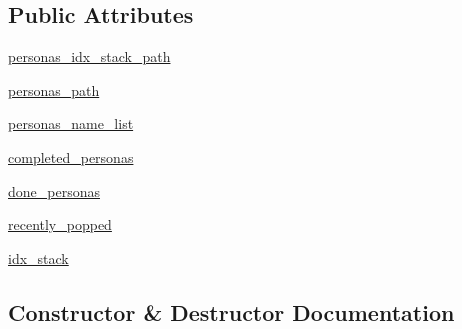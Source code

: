 \subsection*{Public Attributes}
\begin{DoxyCompactItemize}
\item 
\hyperlink{classparlai_1_1mturk_1_1tasks_1_1personachat_1_1personachat__rephrase_1_1worlds_1_1PersonasGenerator_a47aadd2ff6148aa086887f039f046224}{personas\+\_\+idx\+\_\+stack\+\_\+path}
\item 
\hyperlink{classparlai_1_1mturk_1_1tasks_1_1personachat_1_1personachat__rephrase_1_1worlds_1_1PersonasGenerator_a1881802d9147808660941e18155f4f4a}{personas\+\_\+path}
\item 
\hyperlink{classparlai_1_1mturk_1_1tasks_1_1personachat_1_1personachat__rephrase_1_1worlds_1_1PersonasGenerator_ab4a565162feafbcbc20f9f6029c41f34}{personas\+\_\+name\+\_\+list}
\item 
\hyperlink{classparlai_1_1mturk_1_1tasks_1_1personachat_1_1personachat__rephrase_1_1worlds_1_1PersonasGenerator_a7ed591a1f642f4f9113a90cf68fb11d4}{completed\+\_\+personas}
\item 
\hyperlink{classparlai_1_1mturk_1_1tasks_1_1personachat_1_1personachat__rephrase_1_1worlds_1_1PersonasGenerator_a64b6d5528c2c230c4736f68c59311fa2}{done\+\_\+personas}
\item 
\hyperlink{classparlai_1_1mturk_1_1tasks_1_1personachat_1_1personachat__rephrase_1_1worlds_1_1PersonasGenerator_af672da71808e22edc2bbb5ba41c1af13}{recently\+\_\+popped}
\item 
\hyperlink{classparlai_1_1mturk_1_1tasks_1_1personachat_1_1personachat__rephrase_1_1worlds_1_1PersonasGenerator_a62caba399c9988fc5ddb9ec2ae68eb50}{idx\+\_\+stack}
\end{DoxyCompactItemize}


\subsection{Constructor \& Destructor Documentation}
\mbox{\label{classparlai_1_1mturk_1_1tasks_1_1personachat_1_1personachat__rephrase_1_1worlds_1_1PersonasGenerator_a113657139eb52b53cdb044cefb9f5112}} 
